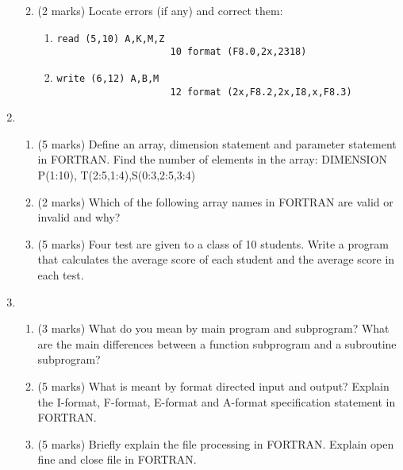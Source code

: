 \documentclass[class=book,crop=false]{standalone}
\begin{document}
\begin{enumerate}
\begin{enumerate}
\begin{enumerate}
            \end{enumerate}
            \item (2 marks) Locate errors (if any) and correct them:
            \begin{enumerate}
                \item \begin{lstlisting}[numbers=none]
                    read (5,10) A,K,M,Z
                    10 format (F8.0,2x,2318)
                \end{lstlisting}
                \item \begin{lstlisting}[numbers=none]
                    write (6,12) A,B,M
                    12 format (2x,F8.2,2x,I8,x,F8.3)
                \end{lstlisting}
            \end{enumerate}
        \end{enumerate}
        \item \begin{enumerate}
            \item (5 marks) Define an array, dimension statement and parameter statement in FORTRAN. Find the number of elements in the array: DIMENSION P(1:10), T(2:5,1:4),S(0:3,2:5,3:4)
            \item (2 marks) Which of the following array names in FORTRAN are valid or invalid and why?\\
            \item (5 marks) Four test are given to a class of 10 students. Write a program that calculates the average score of each student and the average score in each test.
        \end{enumerate}
        \item \begin{enumerate}
            \item (3 marks) What do you mean by main program and subprogram? What are the main differences between a function subprogram and a subroutine subprogram?
            \item (5 marks) What is meant by format directed input  and output? Explain the I-format, F-format, E-format and A-format specification statement in FORTRAN.
            \item (5 marks) Briefly explain the file processing in FORTRAN. Explain open fine and close file in FORTRAN.
        \end{enumerate}
    \end{enumerate}
    
\end{document}
